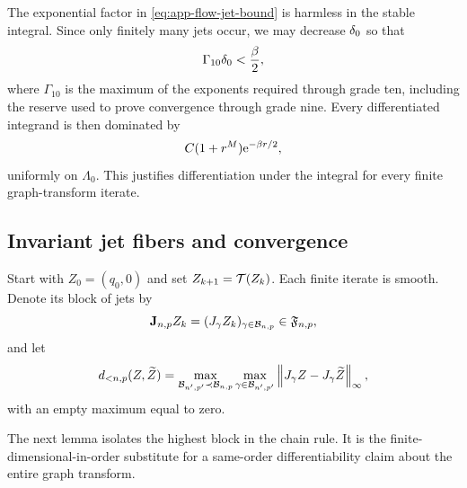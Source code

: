 The exponential factor in \cref{eq:app-flow-jet-bound} is harmless in the
stable integral.  Since only finitely many jets occur, we may decrease
\(\delta_0\) so that
\begin{equation}
\label{eq:app-integrability-choice}
 \Gamma_{10}\delta_0<\frac{\beta}{2},
\end{equation}
where \(\Gamma_{10}\) is the maximum of the exponents required through
grade ten, including the reserve used to prove convergence through grade
nine.  Every differentiated integrand is then dominated by
\begin{equation}
\label{eq:app-integrable-majorant}
 C(1+r^M)\mathrm e^{-\beta r/2},
\end{equation}
uniformly on \(\Lambda_0\).  This justifies differentiation under the
integral for every finite graph-transform iterate.

\subsection{Invariant jet fibers and convergence}
\label{app:compact-fiber-contraction}

Start with \(Z_0=(q_0,0)\) and set \(Z_{k+1}=\mathcal T(Z_k)\).  Each finite
iterate is smooth.  Denote its block of jets by
\begin{equation}
\label{eq:app-block-jet}
 \mathbf J_{n,p}Z_k
 =(J_\gamma Z_k)_{\gamma\in\mathcal B_{n,p}}
 \in\mathfrak F_{n,p},
\end{equation}
and let
\begin{equation}
\label{eq:app-lower-block-distance}
 d_{<n,p}(Z,\widetilde Z)
 =\max_{\mathcal B_{n',p'}\prec\mathcal B_{n,p}}
   \max_{\gamma\in\mathcal B_{n',p'}}
   \left\lVert J_\gamma Z-J_\gamma\widetilde Z\right\rVert_\infty,
\end{equation}
with an empty maximum equal to zero.

The next lemma isolates the highest block in the chain rule.  It is the
finite-dimensional-in-order substitute for a same-order differentiability
claim about the entire graph transform.

